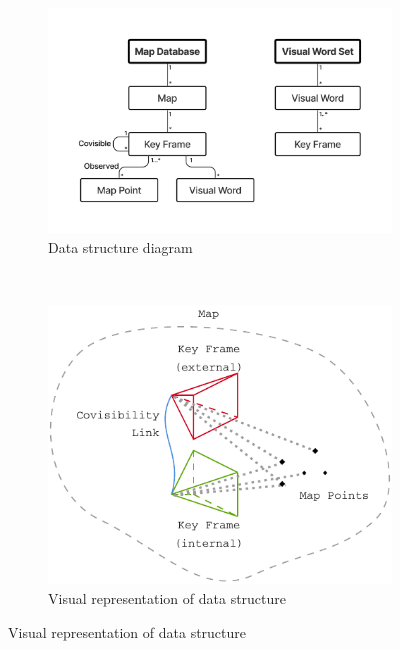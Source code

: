\begin{figure}[h]
    \centering
    \begin{subfigure}[b]{0.475\textwidth}
        \centering
        \includegraphics[trim=5cm 4cm 5cm 5cm, width=\textwidth]{figures/datastructure_diagram.pdf}
        \caption{Data structure diagram}
        \label{fig:datastructure-diagram}
    \end{subfigure}\hfill%
    ~
    \begin{subfigure}[b]{0.425\textwidth}
        \centering
        \includegraphics[width=\textwidth]{figures/datastructure_viz.pdf}
        \caption{Visual representation of data structure}
        \label{fig:datastructure-viz}
    \end{subfigure}%
\end{figure}

